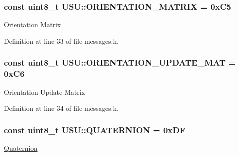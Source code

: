 \hypertarget{namespace_u_s_u_a6bab14d28c02be2a8956e98d18b9b275}{
\subsubsection[{\-O\-R\-I\-E\-N\-T\-A\-T\-I\-O\-N\-\_\-\-M\-A\-T\-R\-I\-X}]{\setlength{\rightskip}{0pt plus 5cm}const uint8\-\_\-t {\bf \-U\-S\-U\-::\-O\-R\-I\-E\-N\-T\-A\-T\-I\-O\-N\-\_\-\-M\-A\-T\-R\-I\-X} = 0x\-C5}}\label{namespace_u_s_u_a6bab14d28c02be2a8956e98d18b9b275}
\-Orientation \-Matrix 

\-Definition at line 33 of file messages.\-h.

\hypertarget{namespace_u_s_u_a9d3464edac1b198f5c02658b36d083bb}{
\subsubsection[{\-O\-R\-I\-E\-N\-T\-A\-T\-I\-O\-N\-\_\-\-U\-P\-D\-A\-T\-E\-\_\-\-M\-A\-T}]{\setlength{\rightskip}{0pt plus 5cm}const uint8\-\_\-t {\bf \-U\-S\-U\-::\-O\-R\-I\-E\-N\-T\-A\-T\-I\-O\-N\-\_\-\-U\-P\-D\-A\-T\-E\-\_\-\-M\-A\-T} = 0x\-C6}}\label{namespace_u_s_u_a9d3464edac1b198f5c02658b36d083bb}
\-Orientation \-Update \-Matrix 

\-Definition at line 34 of file messages.\-h.

\hypertarget{namespace_u_s_u_ad476e2e7f70dbe869e508f676bea92a9}{
\subsubsection[{\-Q\-U\-A\-T\-E\-R\-N\-I\-O\-N}]{\setlength{\rightskip}{0pt plus 5cm}const uint8\-\_\-t {\bf \-U\-S\-U\-::\-Q\-U\-A\-T\-E\-R\-N\-I\-O\-N} = 0x\-D\-F}}\label{namespace_u_s_u_ad476e2e7f70dbe869e508f676bea92a9}
\hyperlink{class_u_s_u_1_1_quaternion}{\-Quaternion} 

